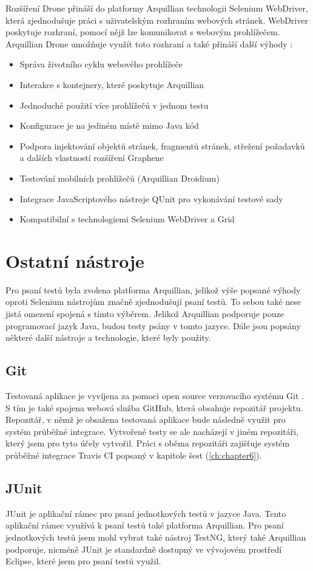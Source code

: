 \documentclass[
    color,   %
	table,   %
    twoside, %
    nolot, nolof
]{fithesis3}
\begin{document}
Rozšíření Drone přináší do platformy Arquillian technologii Selenium WebDriver, která zjednodušuje práci s uživatelským rozhraním webových stránek. WebDriver poskytuje rozhraní, pomocí nějž lze komunikovat s webovým prohlížečem. Arquillian Drone umožňuje využít toto rozhraní a také přináší další výhody \cite{Drone}:
\begin{itemize}
\item Správa životního cyklu webového prohlížeče
\item Interakce s kontejnery, které poskytuje Arquillian
\item Jednoduché použití více prohlížečů v jednom testu
\item Konfigurace je na jediném místě mimo Java kód
\item Podpora injektování objektů stránek, fragmentů stránek, střežení požadavků a dalších vlastností rozšíření Graphene
\item Testování mobilních prohlížečů (Arquillian Droidium)
\item Integrace JavaScriptového nástroje QUnit pro vykonávání testové sady
\item Kompatibilní s technologiemi Selenium WebDriver a Grid
\end{itemize}

\section{Ostatní nástroje}
Pro psaní testů byla zvolena platforma Arquillian, jelikož výše popsané výhody oproti Selenium nástrojům značně zjednodušují psaní testů. To sebou také nese jistá omezení spojená s tímto výběrem. Jelikož Arquillian podporuje pouze programovací jazyk Java, budou testy psány v tomto jazyce. Dále jsou popsány některé další nástroje a technologie, které byly použity.
\subsection{Git}
Testovaná aplikace je vyvíjena za pomoci open source verzovacího systému Git \cite{Git}. S tím je také spojena webová služba GitHub, která obsahuje repozitář projektu. Repozitář, v němž je obsažena testovaná aplikace bude následně využit pro systém průběžné integrace. Vytvořené testy se ale nacházejí v jiném repozitáři, který jsem pro tyto účely vytvořil. Práci s oběma repozitáři zajišťuje systém průběžné integrace Travis CI popsaný v kapitole šest (\ref{ch:chapter6}).
\subsection{JUnit}
JUnit \cite{JUnit} je aplikační rámec pro psaní jednotkových testů v jazyce Java. Tento aplikační rámec využívá k psaní testů také platforma Arquillian. Pro psaní jednotkových testů jsem mohl vybrat také nástroj TestNG, který také Arquillian podporuje, nicméně JUnit je standardně dostupný ve vývojovém prostředí Eclipse, které jsem pro psaní testů využil.
\end{document}
